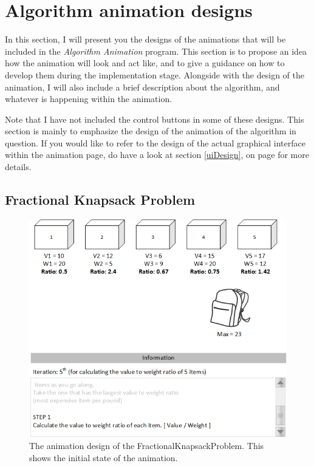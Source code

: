 \newpage

\section{Algorithm animation designs}
In this section, I will present you the designs of the animations that will be included in the \textit{Algorithm Animation} program. This section is to propose an idea how the animation will look and act like, and to give a guidance on how to develop them during the implementation stage. Alongside with the design of the animation, I will also include a brief description about the algorithm, and whatever is happening within the animation.

Note that I have not included the control buttons in some of these designs. This section is mainly to emphasize the design of the animation of the algorithm in question. If you would like to refer to the design of the actual graphical interface within the animation page, do have a look at section \ref{uiDesign}, on page \pageref{uiDesign} for more details.

\subsection{Fractional Knapsack Problem}
\begin{figure}[H]
\centering
\includegraphics[scale=1]{images/report_images/animationDesignFractionalKnapsackProblem_STEP1.png}
\caption{The animation design of the FractionalKnapsackProblem. This shows the initial state of the animation.}
\label{animationDesignFractionalKnapsackProblem}
\end{figure}

